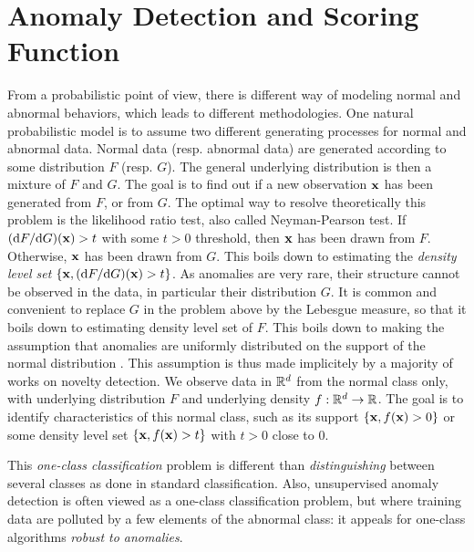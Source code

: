 \section{Anomaly Detection and Scoring Function}
\label{resume:scoring_function}
From a probabilistic point of view, there is different way of modeling normal and abnormal behaviors, which leads to different methodologies. One natural probabilistic model is to assume two different generating processes for normal and abnormal data. Normal data (resp. abnormal data) are generated according to some distribution $F$ (resp. $G$). The general underlying distribution is then a mixture of $F$ and $G$. The goal is to find out if a new observation $\mathbf x$ has been generated from $F$, or from $G$. The optimal way to resolve theoretically this problem is the likelihood ratio test, also called Neyman-Pearson test. If $(\mathrm{d}  F / \mathrm{d}  G) ( \mathbf x) > t$ with some $t>0$ threshold, then $\mathbf x$ has been drawn from $F$. Otherwise, $\mathbf x$ has been drawn from $G$. This boils down to estimating the \emph{density level set} $\{\mathbf x, (\mathrm{d} F / \mathrm{d}  G) (\mathbf x) > t\}$.
%
As anomalies are very rare, their structure cannot be observed in the data, in particular their distribution $G$. 
%
It is common and convenient to replace $G$ in the problem above by the Lebesgue measure, so that it boils down to estimating density level set of $F$.
This boils down to making the assumption that anomalies are uniformly distributed on the support of the normal distribution \citep{Blanchard2010}. This assumption is thus made implicitely by a majority of works on novelty detection.
We observe data in $\mathbb{R}^d$ from the normal class only, with underlying distribution $F$ and underlying density $f: \mathbb{R}^d \to \mathbb{R}$. 
The goal is to identify characteristics of this normal class, such as its support $\{\mathbf x, f( \mathbf x) > 0\}$ or some density level set $\{\mathbf x, f( \mathbf x) > t\}$ with $t>0$ close to $0$.

This \emph{one-class classification} problem is different than \emph{distinguishing} between several classes as done in standard classification. Also, unsupervised anomaly detection is often viewed as a one-class classification problem, but where training data are polluted by a few elements of the abnormal class: it appeals for one-class algorithms \emph{robust to anomalies}. 


